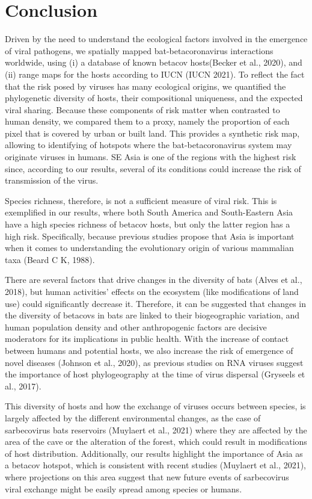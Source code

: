 \documentclass[10pt,oneside]{article}
\begin{document}
\hypertarget{conclusion}{%
\section{Conclusion}\label{conclusion}}

Driven by the need to understand the ecological factors involved in the
emergence of viral pathogens, we spatially mapped bat-betacoronavirus
interactions worldwide, using (i) a database of known betacov
hosts(Becker et al., 2020), and (ii) range maps for the hosts according
to IUCN (IUCN 2021). To reflect the fact that the risk posed by viruses
has many ecological origins, we quantified the phylogenetic diversity of
hosts, their compositional uniqueness, and the expected viral sharing.
Because these components of risk matter when contrasted to human
density, we compared them to a proxy, namely the proportion of each
pixel that is covered by urban or built land. This provides a synthetic
risk map, allowing to identifying of hotspots where the
bat-betacoronavirus system may originate viruses in humans. SE Asia is
one of the regions with the highest risk since, according to our
results, several of its conditions could increase the risk of
transmission of the virus.

Species richness, therefore, is not a sufficient measure of viral risk.
This is exemplified in our results, where both South America and
South-Eastern Asia have a high species richness of betacov hosts, but
only the latter region has a high risk. Specifically, because previous
studies propose that Asia is important when it comes to understanding
the evolutionary origin of various mammalian taxa (Beard C K, 1988).

There are several factors that drive changes in the diversity of bats
(Alves et al., 2018), but human activities' effects on the ecosystem
(like modifications of land use) could significantly decrease it.
Therefore, it can be suggested that changes in the diversity of betacovs
in bats are linked to their biogeographic variation, and human
population density and other anthropogenic factors are decisive
moderators for its implications in public health. With the increase of
contact between humans and potential hosts, we also increase the risk of
emergence of novel diseases (Johnson et al., 2020), as previous studies
on RNA viruses suggest the importance of host phylogeography at the time
of virus dispersal (Gryseels et al., 2017).

This diversity of hosts and how the exchange of viruses occurs between
species, is largely affected by the different environmental changes, as
the case of sarbecovirus bats reservoirs (Muylaert et al., 2021) where
they are affected by the area of the cave or the alteration of the
forest, which could result in modifications of host distribution.
Additionally, our results highlight the importance of Asia as a betacov
hotspot, which is consistent with recent studies (Muylaert et al.,
2021), where projections on this area suggest that new future events of
sarbecovirus viral exchange might be easily spread among species or
humans.
\end{document}
